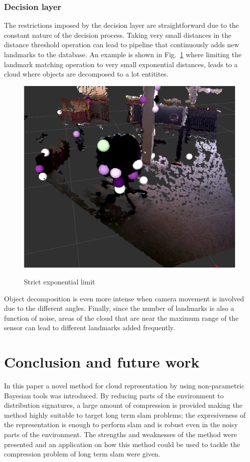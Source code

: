 \documentclass[]{article}
\begin{document}
    \subsubsection{Decision layer}

    The restrictions imposed by the decision layer are straightforward due to the constant nature of the decision process. Taking very small distances in the distance threshold operation can lead to pipeline that continuously adds new landmarks to the database. An example is shown in Fig.~\ref{pip:expo} where limiting the landmark matching operation to very small exponential distances, leads to a cloud where objects are decomposed to a lot entitites.

    \begin{figure}
        \includegraphics[width=.4\textwidth]{monsterchair} \\
        \caption{Strict exponential limit}
        \label{pip:expo}
    \end{figure}

    Object decomposition is even more intense when camera movement is involved due to the different angles. Finally, since the number of landmarks is also a function of noise, areas of the cloud that are near the maximum range of the sensor can lead to different landmarks added frequently.

    \section{Conclusion and future work}
    \label{sec:discussion}

    In this paper a novel method for cloud representation by using non-parametric Bayesian tools was introduced. By reducing parts of the environment to distribution signatures, a large amount of compression is provided making the method highly suitable to target long term slam problems; the expresiveness of the representation is enough to perform slam and is robust even in the noisy parts of the environment. The strengths and weaknesses of the method were presented and an application on how this method could be used to tackle the compression problem of long term slam were given.
\end{document}
